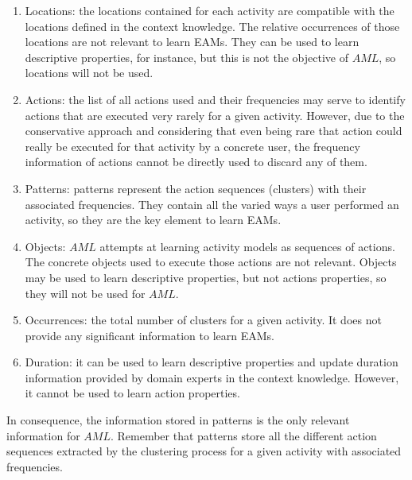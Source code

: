 \begin{enumerate}
 \item Locations: the locations contained for each activity are compatible with the locations defined in the context knowledge. The relative occurrences of those locations are not relevant to learn EAMs. They can be used to learn descriptive properties, for instance, but this is not the objective of $AML$, so locations will not be used.
 \item Actions: the list of all actions used and their frequencies may serve to identify actions that are executed very rarely for a given activity. However, due to the conservative approach and considering that even being rare that action could really be executed for that activity by a concrete user, the frequency information of actions cannot be directly used to discard any of them.
 \item Patterns: patterns represent the action sequences (clusters) with their associated frequencies. They contain all the varied ways a user performed an activity, so they are the key element to learn EAMs.
 \item Objects: $AML$ attempts at learning activity models as sequences of actions. The concrete objects used to execute those actions are not relevant. Objects may be used to learn descriptive properties, but not actions properties, so they will not be used for $AML$.
 \item Occurrences: the total number of clusters for a given activity. It does not provide any significant information to learn EAMs.
 \item Duration: it can be used to learn descriptive properties and update duration information provided by domain experts in the context knowledge. However, it cannot be used to learn action properties.
\end{enumerate}

In consequence, the information stored in patterns is the only relevant information for $AML$. Remember that patterns store all the different action sequences extracted by the clustering process for a given activity with associated frequencies. 

